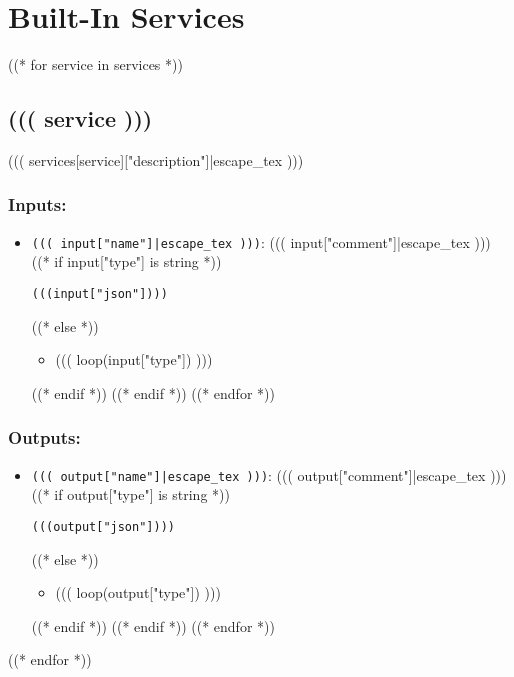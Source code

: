 \section{Built-In Services}
\label{ch:builtinservices}

((* for service in services *))
\subsection{((( service )))}
\label{ch:builtinservices:((( service )))}
((( services[service]["description"]|escape_tex )))
\subsubsection*{Inputs:}
\begin{itemize}
  ((* for input in services[service]["inputs"] recursive *))
    ((* if "name" in input *))
      \item \texttt{((( input["name"]|escape_tex )))}: ((( input["comment"]|escape_tex )))
      ((* if input["type"] is string *))
\begin{lstlisting}
(((input["json"])))
\end{lstlisting}
      ((* else *))
        \begin{itemize}
          \item ((( loop(input["type"]) )))
        \end{itemize}
      ((* endif *))
    ((* endif *))
  ((* endfor *))
\end{itemize}

\subsubsection*{Outputs:}
\begin{itemize}
  ((* for output in services[service]["outputs"] recursive *))
    ((* if "name" in output *))
      \item \texttt{((( output["name"]|escape_tex )))}: ((( output["comment"]|escape_tex )))
      ((* if output["type"] is string *))
\begin{lstlisting}
(((output["json"])))
\end{lstlisting}
      ((* else *))
        \begin{itemize}
          \item ((( loop(output["type"]) )))
        \end{itemize}
      ((* endif *))
    ((* endif *))
  ((* endfor *))
\end{itemize}

((* endfor *))
